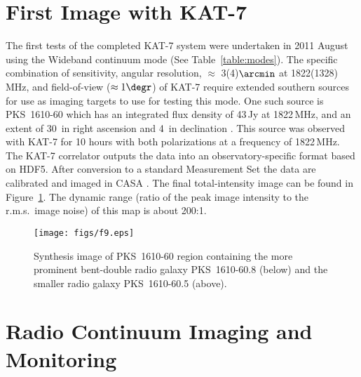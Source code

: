 \section{First Image with KAT-7}
\label{sec:images}

\noindent
The first tests of the completed KAT-7 system were undertaken in 2011
August using the Wideband continuum mode (See
Table~\ref{table:modes}). The specific combination of sensitivity,
angular resolution, $\approx$ 3(4)$\arcmin$ at 1822(1328)\,MHz, and
field-of-view ($\approx 1\degr$) of KAT-7 require extended southern
sources for use as imaging targets to use for testing this mode.  One
such source is \mbox{PKS 1610-60} which has an integrated flux density of
43\,Jy at 1822\,MHz, and an extent of 30\arcmin\ in right ascension and
4\arcmin\ in declination \citep{christiansen}.  This source was
observed with KAT-7 for 10 hours with both polarizations at a
frequency of 1822\,MHz. The KAT-7 correlator outputs the data into an
observatory-specific format based on HDF5.  After conversion to a
standard Measurement Set the data are calibrated and imaged in CASA
\citep{mcmullin}. The final total-intensity image can be found in
Figure~\ref{fig:pks1610}. The dynamic range (ratio of the peak image
intensity to the r.m.s.~image noise) of this map is about 200:1.


\begin{figure}
\texttt{[image: figs/f9.eps]} 
\caption{Synthesis image of \mbox{PKS 1610-60} region containing the more
  prominent bent-double radio galaxy \mbox{PKS 1610-60.8} (below) and the
  smaller radio galaxy \mbox{PKS 1610-60.5} (above).}
\label{fig:pks1610}
\end{figure}



\section{Radio Continuum Imaging and Monitoring}
\label{sec:continuum}

